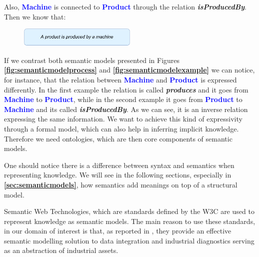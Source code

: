 \documentclass{guideline/sty/rapport}
\begin{document}
Also, \textcolor{blue}{\textbf{Machine}} is connected to \textcolor{blue}{\textbf{Product}} through the relation \textcolor{phthalogreen}{\textbf{\textit{isProducedBy}}}. Then we know that:

    \begin{figure}[H]
        \centering
        \includegraphics[width=0.5\textwidth]{images/implications0-2.pdf}
    \end{figure}
    
If we contrast both semantic models presented in Figures \textbf{\ref{fig:semanticmodelprocess}} and \textbf{\ref{fig:semanticmodelexample}} we can notice, for instance, that the relation between \textcolor{blue}{\textbf{Machine}} and \textcolor{blue}{\textbf{Product}} is expressed differently. In the first example the relation is called \textcolor{phthalogreen}{\textbf{\textit{produces}}} and it goes from \textcolor{blue}{\textbf{Machine}} to \textcolor{blue}{\textbf{Product}}, while in the second example it goes from \textcolor{blue}{\textbf{Product}} to \textcolor{blue}{\textbf{Machine}} and its called \textcolor{phthalogreen}{\textbf{\textit{isProducedBy}}}. As we can see, it is an inverse relation expressing the same information. We want to achieve this kind of expressivity through a formal model, which can also help in inferring implicit knowledge. Therefore we need ontologies, which are then core components of semantic models. \singlespacing

\begin{beware}[Note]
One should notice there is a difference between syntax and semantics when representing knowledge. We will see in the following sections, especially in \textbf{\ref{sec:semanticmodels}}, how semantics add meanings on top of a structural model.
\end{beware}

\begin{beware}[Remark]
Semantic Web Technologies, which are standards defined by the \ac{W3C} are used to represent knowledge as semantic models. The main reason to use these standards, in our domain of interest is that, as reported in \cite{Kharlamov18}, they provide an effective semantic modelling solution to data integration and industrial diagnostics serving as an abstraction of industrial assets.
\end{beware}
\end{document}
